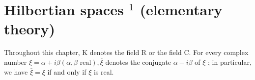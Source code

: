 \chapter{\texorpdfstring{Hilbertian spaces \(^{1}\) (elementary theory)}{Hilbertian spaces \^{}\{1\} (elementary theory)}}

Throughout this chapter, K denotes the field R or the field C. For every complex number \(\xi = \alpha + i\beta (\alpha, \beta \text{ real}), \overline{\xi}\) denotes the conjugate \(\alpha - i\beta\) of \(\xi\) ; in particular, we have \(\overline{\xi} = \xi\) if and only if \(\xi\) is real.

